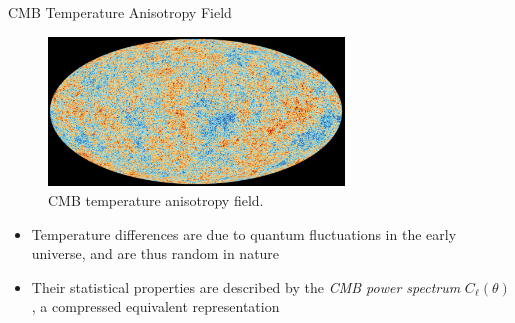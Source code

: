 \documentclass[aspectratio=43,xcolor=svgnames]{beamer} %
\newcommand{\highlightred}[1]{%
  \colorbox{red!50}{$\displaystyle#1$}}
\newcommand{\highlightgreen}[1]{%
  \colorbox{green!50}{$\displaystyle#1$}}
\begin{document}

\begin{frame}{CMB Temperature Anisotropy Field}
    \begin{figure}[H]
        \centering
        \includegraphics[width=0.7\textwidth]{img/Planck_CMB2018.jpg}
        \caption{CMB temperature anisotropy field.}
    \end{figure}
    \pause
    \begin{itemize}[<+->]
        \item Temperature differences are due to quantum fluctuations in the early universe, and are thus random in nature
        \item Their statistical properties are described by the \emph{CMB power spectrum} $C_\ell(\theta)$, a compressed equivalent representation
    \end{itemize}
\end{frame}
\end{document}
